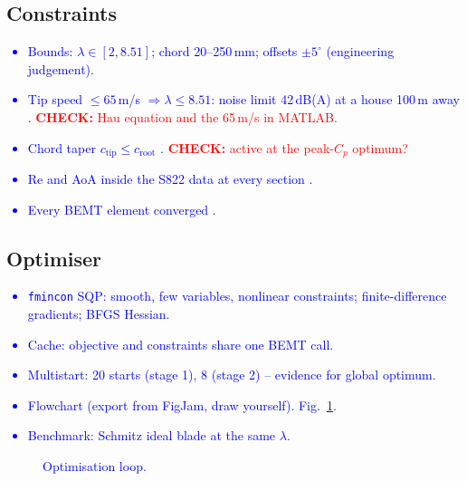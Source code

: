 \documentclass[11pt,a4paper]{article}
\newcommand{\note}[1]{\textcolor{blue}{#1}}
\newcommand{\chk}[1]{\textcolor{red}{\textbf{CHECK:} #1}}
\begin{document}
\subsection{Constraints}
\note{
\begin{itemize}
  \item Bounds: $\lambda \in [2, 8.51]$; chord 20--250\,mm; offsets $\pm 5^\circ$ (engineering judgement).
  \item Tip speed $\le 65$\,m/s $\Rightarrow \lambda \le 8.51$: noise limit 42\,dB(A) at a house 100\,m away \cite{MCS020,Hau2013,Wagner1996}. \chk{Hau equation and the 65\,m/s in MATLAB.}
  \item Chord taper $c_\text{tip} \le c_\text{root}$ \cite{Manwell2009,Burton2011}. \chk{active at the peak-$C_p$ optimum?}
  \item Re and AoA inside the S822 data at every section \cite{Somers2005}.
  \item Every BEMT element converged \cite{Ning2014,Martins2021}.
\end{itemize}
}
\subsection{Optimiser}
\note{
\begin{itemize}
  \item \texttt{fmincon} SQP: smooth, few variables, nonlinear constraints; finite-difference gradients; BFGS Hessian.
  \item Cache: objective and constraints share one BEMT call.
  \item Multistart: 20 starts (stage 1), 8 (stage 2) -- evidence for global optimum.
  \item Flowchart (export from FigJam, draw yourself). Fig.~\ref{fig:flow}.
  \item Benchmark: Schmitz ideal blade \cite{Gasch2012} at the same $\lambda$.
\end{itemize}
}
\begin{figure}[h]\centering
\fbox{\parbox{0.8\textwidth}{\centering \note{Flowchart of the optimisation loop -- export from FigJam.}}}
\caption{\note{Optimisation loop.}}\label{fig:flow}
\end{figure}

\end{document}
